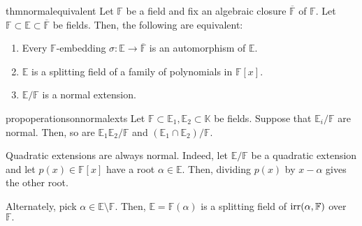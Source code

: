 \begin{restatable}[]{thm}{normalequivalent}
\label{thm:normalequivalent}
    Let $\mathbb{F}$ be a field and fix an algebraic closure $\overline{\mathbb{F}}$ of $\mathbb{F}.$ Let $\mathbb{F} \subset \mathbb{E} \subset \overline{\mathbb{F}}$ be fields. Then, the following are equivalent:
    \begin{enumerate}
         \item \label{item:001} Every $\mathbb{F}$-embedding $\sigma : \mathbb{E} \to \overline{\mathbb{F}}$ is an automorphism of $\mathbb{E}.$
         \item \label{item:002} $\mathbb{E}$ is a splitting field of a family of polynomials in $\mathbb{F}[x].$
         \item \label{item:003} $\mathbb{E}/\mathbb{F}$ is a normal extension. \hfill\hyperref[thm:normalequivalent2]{\downsym}
     \end{enumerate} 
\end{restatable}

\begin{restatable}[]{prop}{operationsonnormalexts}
\label{prop:operationsonnormalexts}
    Let $\mathbb{F} \subset \mathbb{E}_1, \mathbb{E}_2 \subset \mathbb{K}$ be fields. Suppose that $\mathbb{E}_i/\mathbb{F}$ are normal. Then, so are $\mathbb{E}_1\mathbb{E}_2/\mathbb{F}$ and $(\mathbb{E}_1 \cap \mathbb{E}_2)/\mathbb{F}.$ \hfill\hyperref[prop:operationsonnormalexts2]{\downsym}
\end{restatable}

\begin{ex}
    Quadratic extensions are always normal. Indeed, let $\mathbb{E}/\mathbb{F}$ be a quadratic extension and let $p(x) \in \mathbb{F}[x]$ have a root $\alpha \in \mathbb{E}.$ Then, dividing $p(x)$ by $x - \alpha$ gives the other root.

    Alternately, pick $\alpha \in \mathbb{E} \setminus \mathbb{F}.$ Then, $\mathbb{E} = \mathbb{F}(\alpha)$ is a splitting field of $\operatorname{irr}(\alpha, \mathbb{F})$ over $\mathbb{F}.$
\end{ex}


